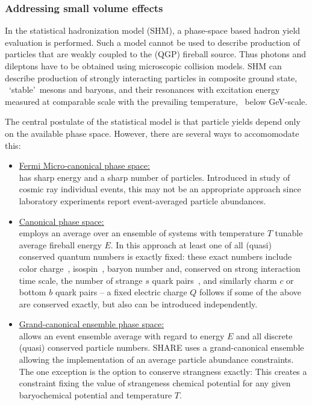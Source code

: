 \subsubsection{Addressing small volume effects}\label{sec:canon}

In the statistical hadronization model (SHM), a phase-space based hadron yield evaluation is performed. Such a model cannot be used to describe production of particles that are weakly coupled to the (QGP) fireball source. Thus photons and dileptons have to be obtained using microscopic collision models. SHM can describe production of strongly interacting particles in composite ground state, \ie\ \lq stable\rq\ mesons and baryons, and their resonances with excitation energy measured at comparable scale with the prevailing temperature, \ie\ below GeV-scale. 

The central postulate of the statistical model is that particle yields depend only on the available phase space. However, there are several ways to accomomodate this:
\begin{itemize}
\item 
\underline{Fermi Micro-canonical phase space:}\\ 
has sharp energy and a sharp number of particles. Introduced in study of cosmic ray individual events, this may not be an appropriate approach since laboratory experiments report event-averaged particle abundances.
\item 
\underline{Canonical phase space:} \\
employs an average over an ensemble of systems with temperature $T$ tunable average fireball energy $E$. In this approach at least one of all (quasi) conserved quantum numbers is exactly fixed: these exact numbers include color charge~\cite{Turko:1981nr,Elze:1983du,Elze:1984un}, isospin~\cite{Muller:1982gd}, baryon number\cite{Derreth:1985kk} and, conserved on strong interaction time scale, the number of strange $s$ quark pairs~\cite{Rafelski:1980gk,Rafelski:2001bu}, and similarly charm $c$ or bottom $b$ quark pairs -- a fixed electric charge $Q$ follows if some of the above are conserved exactly, but also can be introduced independently.
\item 
\underline{Grand-canonical ensemble phase space:}\\ 
allows an event ensemble average with regard to energy $E$ and all discrete (quasi) conserved particle numbers. SHARE uses a grand-canonical ensemble allowing the implementation of an average particle abundance constraints. The one exception is the option to conserve strangness exactly: This creates a constraint fixing the value of strangeness chemical potential for any given baryochemical potential and temperature $T$. 
\end{itemize}

